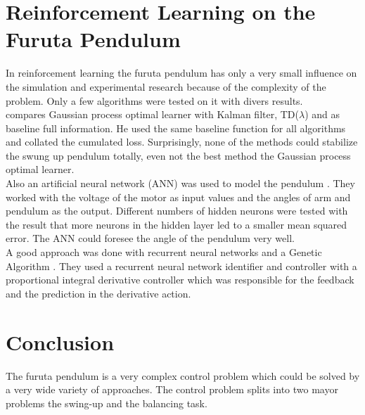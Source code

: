 \section{Reinforcement Learning on the Furuta Pendulum}
In reinforcement learning the furuta pendulum has only a very small influence 
on the simulation and experimental research because of the complexity of the 
problem. Only a few algorithms were tested on it with divers results.\\
\citeauthor{hennig2011optimal} compares Gaussian process optimal learner with 
Kalman filter, TD($\lambda$) and as baseline full information. He used the same 
baseline function for all algorithms and collated the cumulated loss. 
Surprisingly, none of the methods could stabilize the swung up pendulum 
totally, even not the best method the Gaussian process optimal learner.\\
Also an artificial neural network (ANN) was used to model the pendulum 
\cite{quyen2012rotary}. They worked with the voltage of the motor as input 
values and the angles of arm and pendulum as the output. Different numbers of 
hidden neurons were tested with the result that more neurons in the hidden 
layer led to a smaller mean squared error. The ANN could foresee the angle of 
the pendulum very well.\\
A good approach was done with recurrent neural networks and a Genetic Algorithm 
\cite{shojaei2011hybrid}. They used a recurrent neural network identifier and 
controller with a proportional integral derivative controller which was 
responsible for the feedback and the prediction in the derivative action.


\section{Conclusion}
The furuta pendulum is a very complex control problem which could be solved by 
a very wide variety of approaches. The control problem splits into two mayor 
problems the swing-up and the balancing task.








